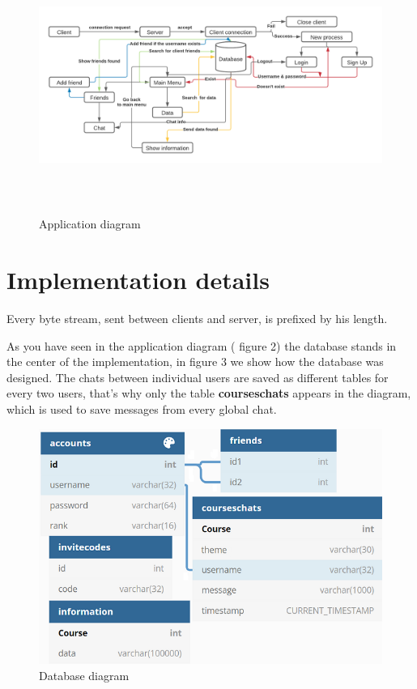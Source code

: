 \documentclass[runningheads]{llncs}
\begin{document}
\begin{figure}[H]
\includegraphics[width=6.6in, height=3.3in]{images/application.png}
\caption{Application diagram}
\end{figure}

\newpage
\section{Implementation details}
\par Every byte stream, sent between clients and server, is prefixed by his length.  
\par As you have seen in the application diagram ( figure 2) the database stands in the center of the implementation, in figure 3 we show how the database was designed. The chats between individual users are saved as different tables for every two users, that's why only the table \textbf{courseschats} appears in the diagram, which is used to save messages from every global chat.

\begin{figure}[H]
\includegraphics[]{images/dbdiagram.png}
\caption{Database diagram}
\end{figure}
\end{document}
